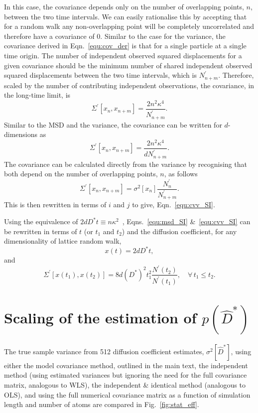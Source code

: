\documentclass[reprint,superscriptaddress,nobibnotes,amsmath,amssymb,aps,prx,hidelinks]{revtex4-2}
\newcommand{\oMSDs}[1]{\ensuremath{x}(#1)}
\newcommand{\oMSDn}{\ensuremath{x_n}}
\newcommand{\oMSDm}{\ensuremath{x_{n + m}}}
\newcommand{\prob}[1]{\ensuremath{p(#1)}}
\newcommand{\nind}[1]{\ensuremath{N^\prime_{#1}}}
\newcommand{\Dest}{\ensuremath{\widehat{D}^*}}
\newcommand{\D}{\ensuremath{D^*}}
\newcommand{\var}[1]{\ensuremath{\sigma^2[#1]}}
\begin{document}
In this case, the covariance depends only on the number of overlapping points, $n$, between the two time intervals. 
We can easily rationalise this by accepting that for a random walk any non-overlapping point will be completely uncorrelated and therefore have a covariance of \num{0}. 
Similar to the case for the variance, the covariance derived in Eqn.~\ref{equ:cov_der} is that for a single particle at a single time origin. 
The number of independent observed squared displacements for a given covariance should be the minimum number of shared independent observed squared displacements between the two time intervals, which is $\nind{n+m}$. 
Therefore, scaled by the number of contributing independent observations, the covariance, in the long-time limit, is
%
\begin{equation}
    \Sigma^\prime \left[\oMSDn, \oMSDm \right] = \frac{2n^2\kappa^4}{\nind{n+m}}.
\end{equation}
%
Similar to the MSD and the variance, the covariance can be written for $d$-dimensions as 
%
\begin{equation}
    \Sigma^\prime \left[\oMSDn, \oMSDm \right] = \frac{2n^2\kappa^4}{d\nind{n+m}}.
\end{equation}
%
The covariance can be calculated directly from the variance by recognising that both depend on the number of overlapping points, $n$, as follows
%
\begin{equation}
    \Sigma^\prime \left[\oMSDn, \oMSDm \right] = \var{\oMSDn}\frac{\nind{n}}{\nind{n+m}}.
\end{equation}
%
This is then rewritten in terms of $i$ and $j$ to give, Eqn.~\ref{equ:cvv_SI}.

Using the equivalence of $2d\D t \equiv n\kappa^2$~\cite{howard_reports_1964}, Eqns.~\ref{equ:msd_SI} \&~\ref{equ:cvv_SI} can be rewritten in terms of $t$ (or $t_1$ and $t_2$) and the diffusion coefficient, for any dimensionality of lattice random walk,
%
\begin{equation}
    \oMSDs{t} = 2d \D t,
    \label{equ:der_msd_fick}
\end{equation}
%
and 
%
\begin{equation}
    \Sigma^\prime \left[\oMSDs{t_1}, \oMSDs{t_2} \right] = 8d{(\D)}^2 t_1^2\frac{N^\prime(t_2)}{N^\prime(t_1)},\hspace{1em} \forall\,t_1 \leq t_2.
\end{equation}
%

\section{Scaling of the estimation of $\prob{\Dest}$}
\label{sec:scaling}
%
The true sample variance from \num{512} diffusion coefficient estimates, $\var{\Dest}$, using either the model covariance method, outlined in the main text, the independent method (using estimated variances but ignoring the need for the full covariance matrix, analogous to WLS), the independent \& identical method (analogous to OLS), and using the full numerical covariance matrix as a function of simulation length and number of atoms are compared in Fig.~\ref{fig:stat_eff}.
\end{document}
